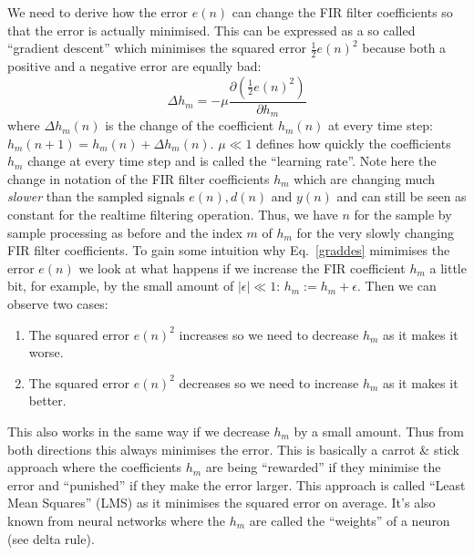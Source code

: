 \documentclass[12pt,a4paper]{article}
\begin{document}
We need to derive how the error $e(n)$ can change the FIR filter
coefficients so that the error is actually minimised. This can be
expressed as a so called ``gradient descent'' which minimises the squared
error $\frac{1}{2} e(n)^2$ because both a positive and a negative
error are equally bad:
\begin{equation}
  \Delta h_m = - \mu \frac{\partial\left( \frac{1}{2}e(n)^2 \right)}{\partial h_m} \label{graddes}
\end{equation}
where $\Delta h_m(n)$ is the change of the coefficient $h_m(n)$ at
every time step: $h_m(n+1) = h_m(n) + \Delta h_m(n)$.  $\mu \ll 1$
defines how quickly the coefficients $h_m$ change at every time step
and is called the ``learning rate''. Note here the change in notation
of the FIR filter coefficients $h_m$ which are changing much
\textsl{slower} than the sampled signals $e(n), d(n)$ and $y(n)$ and
can still be seen as constant for the realtime filtering
operation. Thus, we have $n$ for the sample by sample processing as
before and the index $m$ of $h_m$ for the very slowly changing FIR
filter coefficients. To gain some intuition why
Eq.~\ref{graddes} mimimises the error $e(n)$ we look at what happens if we
increase the FIR coefficient $h_m$ a little bit, for example, by the
small amount of $|\epsilon| \ll 1$: $h_m := h_m + \epsilon$. Then we can
observe two cases:
\begin{enumerate}
\item The squared error $e(n)^2$ increases so we need to decrease $h_m$ as it makes it worse.
\item The squared error $e(n)^2$ decreases so we need to increase $h_m$ as it makes it better.
\end{enumerate}
This also works in the same way if we decrease $h_m$ by a small amount. Thus from
both directions this always minimises the error. This is basically a carrot \& stick
approach where the coefficients $h_m$ are being ``rewarded'' if they minimise the error and
``punished'' if they make the error larger. This approach is called ``Least Mean Squares'' (LMS)
as it minimises the squared error on average. It's also known from neural networks where
the $h_m$ are called the ``weights'' of a neuron (see delta rule).
\end{document}
